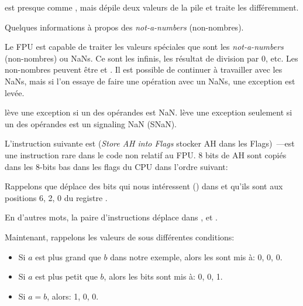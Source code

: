 



\FUCOMPP{} est presque comme \FCOM, mais dépile deux valeurs de la pile et traite
les  différemment.

Quelques informations à propos des \emph{not-a-numbers} (non-nombres).

Le FPU est capable de traiter les valeurs spéciales que sont les \emph{not-a-numbers}
(non-nombres) ou \gls{NaN}s.
Ce sont les infinis, les résultat de division par 0, etc.
Les non-nombres peuvent être  et . Il est possible de continuer
à travailler avec les  NaNs, mais si l'on essaye de faire une opération avec
un  NaNs, une exception est levée.


\FCOM lève une exception si un des opérandes est \gls{NaN}.
\FUCOM lève une exception seulement si un des opérandes est un signaling \gls{NaN}
(SNaN).

\label{SAHF}

L'instruction suivante est \SAHF (\emph{Store AH into Flags} stocker AH dans les Flags)~---est
une instruction rare dans le code non relatif au FPU.
8 bits de AH sont copiés dans les 8-bits bas dans les flags du CPU dans l'ordre suivant:




Rappelons que \FNSTSW déplace des bits qui nous intéressent (\CThreeBits) dans \AH
et qu'ils sont aux positions 6, 2, 0 du registre \AH.



En d'autres mots, la paire d'instructions  déplace \CThreeBits
dans \ZF, \PF et \CF.

Maintenant, rappelons les valeurs de \CThreeBits sous différentes conditions:

\begin{itemize}
\item Si $a$ est plus grand que $b$ dans notre exemple, alors les \CThreeBits sont
mis à: 0, 0, 0.
\item Si $a$ est plus petit que $b$, alors les bits sont mis à: 0, 0, 1.
\item Si $a=b$, alors: 1, 0, 0.
\end{itemize}

